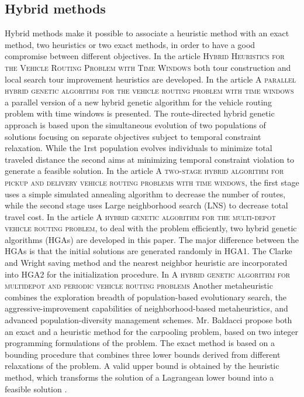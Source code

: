 \documentclass[12pt, a4paper, twoside]{memoir}
\newcommand{\newpar}{\vskip 0.2in \noindent}
\begin{document}
{	\subsection{Hybrid methods}
	Hybrid methods make it possible to associate a heuristic method with an exact method, two heuristics or two exact methods, in order to have a good compromise between different objectives.
	\newpar
	In the article \textsc{Hybrid Heuristics for the Vehicle Routing Problem with Time Windows}\cite{russellhybrid1995} both tour construction and local search tour improvement heuristics are developed. In the article \textsc{A parallel hybrid genetic algorithm for the vehicle routing problem with time windows}\cite{bergerparallel2004} a parallel version of a new hybrid genetic algorithm for the vehicle routing problem with time windows is presented. The route-directed hybrid genetic approach is based upon the simultaneous evolution of two populations of solutions focusing on separate objectives subject to temporal constraint relaxation. While the 1rst population evolves individuals to minimize total traveled distance the second aims at minimizing temporal constraint violation to generate a feasible solution. In the article \textsc{A two-stage hybrid algorithm for pickup and delivery vehicle routing problems with time windows}\cite{benttwo-stage2006}, the first stage uses a simple simulated annealing algorithm to decrease the number of routes, while the second stage uses Large neighborhood search (LNS) to decrease total travel cost. In the article \textsc{A hybrid genetic algorithm for the multi-depot vehicle routing problem}\cite{hohybrid2008}, to deal with the problem efficiently, two hybrid genetic algorithms (HGAs) are developed in this paper. The major difference between the HGAs is that the initial solutions are generated randomly in HGA1. The Clarke and Wright saving method and the nearest neighbor heuristic are incorporated into HGA2 for the initialization procedure. In \textsc{A hybrid genetic algorithm for multidepot and periodic vehicle routing problems}\cite{vidalhybrid2012} Another metaheuristic combines the exploration breadth of population-based evolutionary search, the aggressive-improvement capabilities of neighborhood-based metaheuristics, and advanced population-diversity management schemes.
	\newpar
	Mr. Baldacci propose both an exact and a heuristic method for the carpooling problem, based on two integer programming formulations of the problem. The exact method is based on a bounding procedure that combines three lower bounds derived from different relaxations of the problem. A valid upper bound is obtained by the heuristic method, which transforms the solution of a Lagrangean lower bound into a feasible solution \cite{baldacciexact2004}.

}
\end{document}
